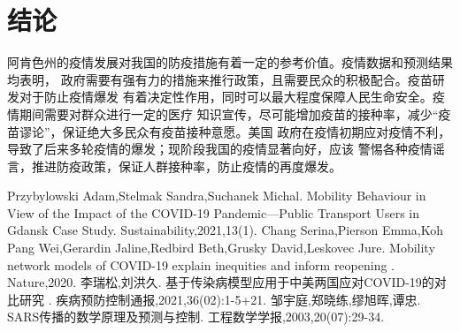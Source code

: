 \documentclass{cumcmthesis}
\begin{document}
\section{结论}
阿肯色州的疫情发展对我国的防疫措施有着一定的参考价值。疫情数据和预测结果均表明，
政府需要有强有力的措施来推行政策，且需要民众的积极配合。疫苗研发对于防止疫情爆发
有着决定性作用，同时可以最大程度保障人民生命安全。疫情期间需要对群众进行一定的医疗
知识宣传，尽可能增加疫苗的接种率，减少“疫苗谬论”，保证绝大多民众有疫苗接种意愿。美国
政府在疫情初期应对疫情不利，导致了后来多轮疫情的爆发；现阶段我国的疫情显著向好，应该
警惕各种疫情谣言，推进防疫政策，保证人群接种率，防止疫情的再度爆发。

\begin{thebibliography}{9}%
    \renewcommand\refname{}
    Przybylowski Adam,Stelmak Sandra,Suchanek Michal.
    \newblock Mobility Behaviour in View of the Impact of the COVID-19 Pandemic—Public Transport Users in Gdansk Case Study{}\allowbreak[J].
    \newblock Sustainability,2021,13(1).
    Chang Serina,Pierson Emma,Koh Pang Wei,Gerardin Jaline,Redbird Beth,Grusky David,Leskovec Jure.
    \newblock Mobility network models of COVID-19 explain inequities and inform reopening {}\allowbreak[J].
    \newblock Nature,2020.
    李瑞松,刘洪久.
    \newblock 基于传染病模型应用于中美两国应对COVID-19的对比研究 {}\allowbreak[J].
    \newblock 疾病预防控制通报,2021,36(02):1-5+21.
    邹宇庭,郑晓练,缪旭晖,谭忠.
    \newblock SARS传播的数学原理及预测与控制{}\allowbreak[J].
    \newblock ⼯程数学学报,2003,20(07):29-34.
\end{thebibliography}
\end{document}
